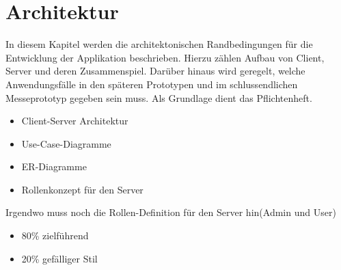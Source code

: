 \chapter{Architektur}
\label{cha:architektur}
In diesem Kapitel werden die architektonischen Randbedingungen für die Entwicklung der Applikation beschrieben. Hierzu zählen Aufbau von Client, Server und deren Zusammenspiel. Darüber hinaus wird geregelt, welche Anwendungsfälle in den späteren Prototypen und im schlussendlichen Messeprototyp gegeben sein muss. Als Grundlage dient das Pflichtenheft.
\begin{itemize}
\item Client-Server Architektur
\item Use-Case-Diagramme
\item ER-Diagramme
\item Rollenkonzept für den Server
\end{itemize}

Irgendwo muss noch die Rollen-Definition für den Server hin(Admin und User)

\begin{itemize}
\item 80\% zielführend
\item 20\% gefälliger Stil
\end{itemize}